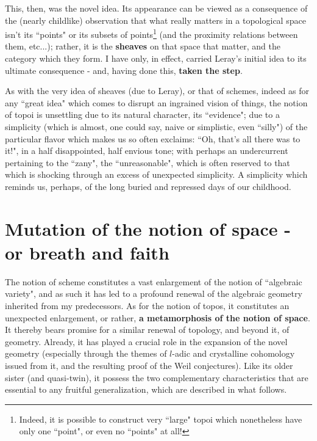 This, then, was the novel idea. Its appearance can be viewed as a consequence of the (nearly childlike) observation that what really matters in a topological space isn't its ``points" or its subsets of points\footnote{Indeed, it is possible to construct very ``large" topoi which nonetheless have only one ``point", or even no ``points" at all!} (and the proximity relations between them, etc...); rather, it is the \textbf{sheaves} on that space that matter, and the category which they form. I have only, in effect, carried Leray's initial idea to its ultimate consequence - and, having done this, \textbf{taken the step}.

As with the very idea of sheaves (due to Leray), or that of schemes, indeed as for any ``great idea" which comes to disrupt an ingrained vision of things, the notion of topoi is unsettling due to its natural character, its ``evidence"; due to a simplicity (which is almost, one could say, naive or simplistic, even ``silly") of the particular flavor which makes us so often exclaims: ``Oh, that's all there was to it!", in a half disappointed, half envious tone; with perhaps an undercurrent pertaining to the ``zany", the ``unreasonable", which is often reserved to that which is shocking through an excess of unexpected simplicity. A simplicity which reminds us, perhaps, of the long buried and repressed days of our childhood.

\section{Mutation of the notion of space - or breath and faith}

The notion of scheme constitutes a vast enlargement of the notion of ``algebraic variety", and as such it has led to a profound renewal of the algebraic geometry inherited from my predecessors. As for the notion of topos, it constitutes an unexpected enlargement, or rather, \textbf{a metamorphosis of the notion of space}. It thereby bears promise for a similar renewal of topology, and beyond it, of geometry. Already, it has played a crucial role in the expansion of the novel geometry (especially through the themes of $l$-adic and crystalline cohomology issued from it, and the resulting proof of the Weil conjectures). Like its older sister (and quasi-twin), it possess the two complementary characteristics that are essential to any fruitful generalization, which are described in what follows.

